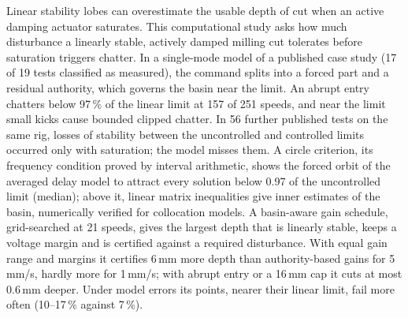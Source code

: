 Linear stability lobes can overestimate the usable depth of cut when an active damping actuator saturates. This computational study asks how much disturbance a linearly stable, actively damped milling cut tolerates before saturation triggers chatter. In a single-mode model of a published case study (17 of 19 tests classified as measured), the command splits into a forced part and a residual authority, which governs the basin near the limit. An abrupt entry chatters below 97\,\% of the linear limit at 157 of 251 speeds, and near the limit small kicks cause bounded clipped chatter. In 56 further published tests on the same rig, losses of stability between the uncontrolled and controlled limits occurred only with saturation; the model misses them. A circle criterion, its frequency condition proved by interval arithmetic, shows the forced orbit of the averaged delay model to attract every solution below 0.97 of the uncontrolled limit (median); above it, linear matrix inequalities give inner estimates of the basin, numerically verified for collocation models. A basin-aware gain schedule, grid-searched at 21 speeds, gives the largest depth that is linearly stable, keeps a voltage margin and is certified against a required disturbance. With equal gain range and margins it certifies 6\,mm more depth than authority-based gains for 5\,mm/s, hardly more for 1\,mm/s; with abrupt entry or a 16\,mm cap it cuts at most 0.6\,mm deeper. Under model errors its points, nearer their linear limit, fail more often (10--17\,\% against 7\,\%).
